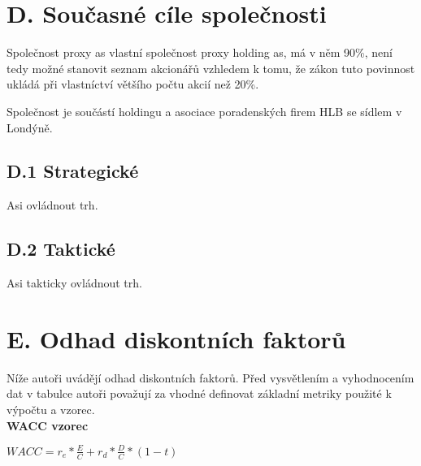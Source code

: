 \newpage


\section*{D. Současné cíle společnosti}
\label{sec:Soucasne cile spolecnosti}

Společnost proxy as vlastní společnost proxy holding as, má v něm 90\%, není tedy možné stanovit seznam akcionářů vzhledem k tomu, že zákon tuto povinnost ukládá při vlastníctví většího počtu akcií než 20\%.

Společnost je součástí holdingu a asociace poradenských firem HLB se sídlem v Londýně.

\subsection*{D.1 Strategické}
\label{sec:Strategicke}

Asi ovládnout trh.

\subsection*{D.2 Taktické}
\label{sec:Takticke}

Asi takticky ovládnout trh.

\newpage

\section*{E. Odhad diskontních faktorů}
\label{sec:Odhad diskontnich faktoru}

Níže autoři uvádějí odhad diskontních faktorů. Před vysvětlením a vyhodnocením dat v tabulce autoři považují za vhodné definovat základní metriky použité k výpočtu a vzorec.\\

\noindent\textbf{WACC vzorec}\\

\begin{center}
$WACC = r_e * \frac{E}{C} + r_d * \frac{D}{C} * (1 - t)$\\
\end{center}

